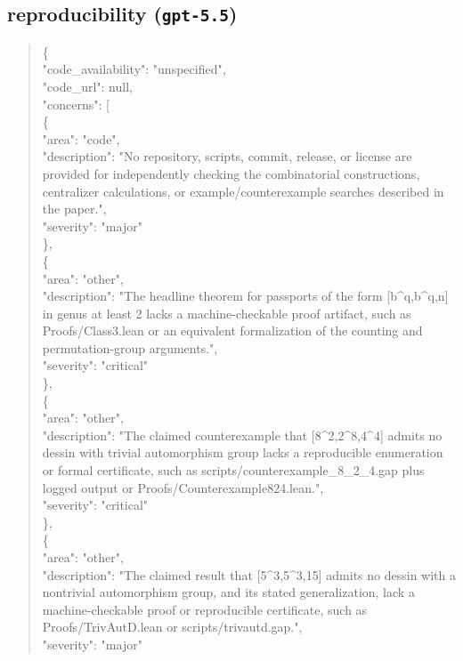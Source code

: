 \documentclass[11pt]{article}
\begin{document}
\subsection*{reproducibility (\texttt{gpt-5.5})}
\begin{quote}\small\ttfamily\raggedright
\{\\
  "code\_availability": "unspecified",\\
  "code\_url": null,\\
  "concerns": [\\
    \{\\
      "area": "code",\\
      "description": "No repository, scripts, commit, release, or license are provided for independently checking the combinatorial constructions, centralizer calculations, or example/counterexample searches described in the paper.",\\
      "severity": "major"\\
    \},\\
    \{\\
      "area": "other",\\
      "description": "The headline theorem for passports of the form [b\^{}q,b\^{}q,n] in genus at least 2 lacks a machine-checkable proof artifact, such as Proofs/Class3.lean or an equivalent formalization of the counting and permutation-group arguments.",\\
      "severity": "critical"\\
    \},\\
    \{\\
      "area": "other",\\
      "description": "The claimed counterexample that [8\^{}2,2\^{}8,4\^{}4] admits no dessin with trivial automorphism group lacks a reproducible enumeration or formal certificate, such as scripts/counterexample\_8\_2\_4.gap plus logged output or Proofs/Counterexample824.lean.",\\
      "severity": "critical"\\
    \},\\
    \{\\
      "area": "other",\\
      "description": "The claimed result that [5\^{}3,5\^{}3,15] admits no dessin with a nontrivial automorphism group, and its stated generalization, lack a machine-checkable proof or reproducible certificate, such as Proofs/TrivAutD.lean or scripts/trivautd.gap.",\\
      "severity": "major"\\

\end{quote}
\end{document}
